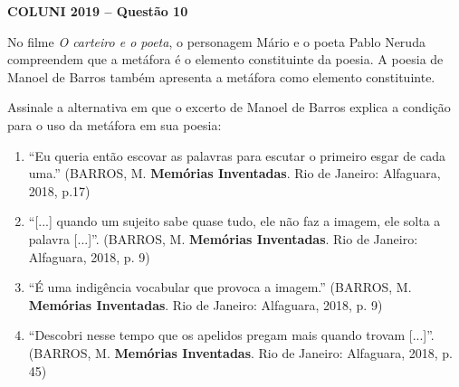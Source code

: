 \textbf{COLUNI 2019 -- Questão 10}\par\medskip No filme \textit{O carteiro e o poeta}, o personagem Mário e o poeta Pablo Neruda compreendem que a metáfora é o elemento constituinte da poesia. A poesia de Manoel de Barros também apresenta a metáfora como elemento constituinte.

\par

Assinale a alternativa em que o excerto de Manoel de Barros explica a condição para o uso da metáfora em sua poesia:\begin{enumerate}
\item “Eu queria então escovar as palavras para escutar o primeiro esgar de cada uma.” (BARROS, M. \textbf{Memórias Inventadas}. Rio
      de Janeiro: Alfaguara, 2018, p.17)
\item “[...] quando um sujeito sabe quase tudo, ele não faz a imagem, ele solta a palavra [...]”. (BARROS, M. \textbf{Memórias
      Inventadas}. Rio de Janeiro: Alfaguara, 2018, p. 9)
\item “É uma indigência vocabular que provoca a imagem.” (BARROS, M. \textbf{Memórias Inventadas}. Rio de Janeiro: Alfaguara, 2018, p. 9)
\item “Descobri nesse tempo que os apelidos pregam mais quando trovam [...]”. (BARROS, M. \textbf{Memórias Inventadas}. Rio de
      Janeiro: Alfaguara, 2018, p. 45)

\end{enumerate}
